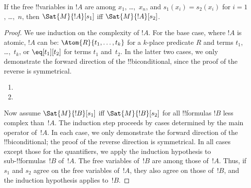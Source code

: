 \documentclass[../../../include/open-logic-section]{subfiles}
\begin{document}
\begin{prop}
If the free !!{variable}s in $!A$ are among $x_1$, \dots,~$x_n$, and
$s_1(x_i) = s_2(x_i)$ for $i = 1$, \dots,~$n$, then $\Sat{M}{!A}[s_1]$
iff $\Sat{M}{!A}[s_2]$.
\end{prop}

\begin{proof}
We use induction on the complexity of $!A$. For the base case, where
$!A$ is atomic, $!A$ can be:
$\Atom{R}{t_1, \dots, t_k}$ for a $k$-place predicate $R$ and terms
$t_1$, \dots,~$t_k$, or $\eq[t_1][t_2]$ for terms $t_1$ and~$t_2$.
In the latter two cases, we only demonstrate the forward direction of
the !!{biconditional}, since the proof of the reverse is symmetrical.

\begin{enumerate}


\item
\item
\end{enumerate}

Now assume $\Sat{M}{!B}[s_1]$ iff $\Sat{M}{!B}[s_2]$ for all
!!{formula}s $!B$ less complex than~$!A$. The induction step proceeds
by cases determined by the main operator of~$!A$. In each case, we
only demonstrate the forward direction of the !!{biconditional}; the
proof of the reverse direction is symmetrical. In all cases except
those for the quantifiers, we apply the induction hypothesis to
sub-!!{formula}s~$!B$ of~$!A$.  The free variables of~$!B$ are among
those of~$!A$. Thus, if $s_1$ and $s_2$ agree on the free variables
of~$!A$, they also agree on those of~$!B$, and the induction
hypothesis applies to~$!B$.


\end{proof}
\end{document}
